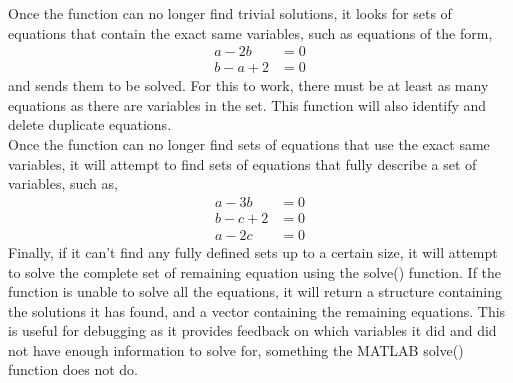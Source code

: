 Once the function can no longer find trivial solutions, it looks for sets of equations that contain the exact same variables, such as equations of the form,
\begin{subequations}
	\begin{align}
		a -2b &= 0\\
		b -a +2 &= 0 
	\end{align}
\end{subequations}
and sends them to be solved. For this to work, there must be at least as many equations as there are variables in the set. This function will also identify and delete duplicate equations.\\
Once the function can no longer find sets of equations that use the exact same variables, it will attempt to find sets of equations that fully describe a set of variables, such as,
\begin{subequations}
	\begin{align}
		a -3b &= 0\\
		b -c +2&= 0\\
		a -2c &= 0
	\end{align}
\end{subequations}
Finally, if it can't find any fully defined sets up to a certain size, it will attempt to solve the complete set of remaining equation using the solve() function. If the function is unable to solve all the equations, it will return a structure containing the solutions it has found, and a vector containing the remaining equations. This is useful for debugging as it provides feedback on which variables it did and did not have enough information to solve for, something the MATLAB solve() function does not do.\\



